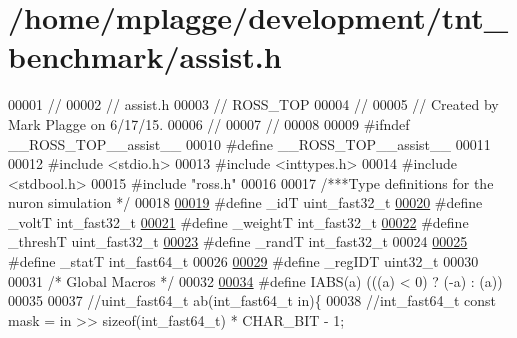 \hypertarget{assist_8h_source}{}\section{/home/mplagge/development/tnt\+\_\+benchmark/assist.h}

\begin{DoxyCode}
00001 \textcolor{comment}{//}
00002 \textcolor{comment}{//  assist.h}
00003 \textcolor{comment}{//  ROSS\_TOP}
00004 \textcolor{comment}{//}
00005 \textcolor{comment}{//  Created by Mark Plagge on 6/17/15.}
00006 \textcolor{comment}{//}
00007 \textcolor{comment}{//}
00008 
00009 \textcolor{preprocessor}{#ifndef \_\_ROSS\_TOP\_\_assist\_\_}
00010 \textcolor{preprocessor}{#define \_\_ROSS\_TOP\_\_assist\_\_}
00011 
00012 \textcolor{preprocessor}{#include <stdio.h>}
00013 \textcolor{preprocessor}{#include <inttypes.h>}
00014 \textcolor{preprocessor}{#include <stdbool.h>}
00015 \textcolor{preprocessor}{#include "ross.h"}
00016 
00017 \textcolor{comment}{/***Type definitions for the nuron simulation */}
00018 
\hypertarget{assist_8h_source_l00019}{}\hyperlink{assist_8h_a3f7a6e6a1210b6d9d7a42177dcb9634b}{00019} \textcolor{preprocessor}{#define \_idT uint\_fast32\_t }
\hypertarget{assist_8h_source_l00020}{}\hyperlink{assist_8h_abe1fc1b8f9efd1187e564bcb8de7f815}{00020} \textcolor{preprocessor}{#define \_voltT int\_fast32\_t }
\hypertarget{assist_8h_source_l00021}{}\hyperlink{assist_8h_aa73c5ea0fe4ba938c96e6771b38dcb2a}{00021} \textcolor{preprocessor}{#define \_weightT int\_fast32\_t }
\hypertarget{assist_8h_source_l00022}{}\hyperlink{assist_8h_a5537d30256d443ce07efd3d879a4a720}{00022} \textcolor{preprocessor}{#define \_threshT uint\_fast32\_t }
\hypertarget{assist_8h_source_l00023}{}\hyperlink{assist_8h_a520ac495f188eb0bc5645cffa3c4328b}{00023} \textcolor{preprocessor}{#define \_randT int\_fast32\_t }
00024 \textcolor{preprocessor}{}
\hypertarget{assist_8h_source_l00025}{}\hyperlink{assist_8h_ad77e6fc5a9b03d46e7c97b7c4b92e89f}{00025} \textcolor{preprocessor}{#define \_statT int\_fast64\_t }
00026 \textcolor{preprocessor}{}
\hypertarget{assist_8h_source_l00029}{}\hyperlink{assist_8h_abd3130ec511af0cc7768768554bd36a0}{00029} \textcolor{preprocessor}{#define \_regIDT uint32\_t}
00030 
00031 \textcolor{comment}{/* Global Macros */}
00032 
\hypertarget{assist_8h_source_l00034}{}\hyperlink{assist_8h_aaf4b596256d346dd40bc6f14c3eb9371}{00034} \textcolor{preprocessor}{#define IABS(a) (((a) < 0) ? (-a) : (a))}
00035 
00037     \textcolor{comment}{//uint\_fast64\_t ab(int\_fast64\_t in)\{}
00038     \textcolor{comment}{//int\_fast64\_t const mask = in >> sizeof(int\_fast64\_t) * CHAR\_BIT - 1;}

\end{DoxyCode}
